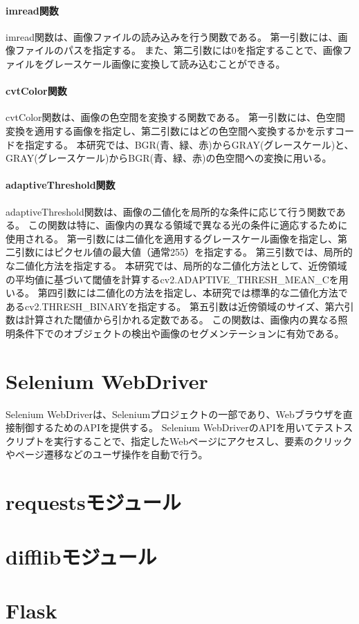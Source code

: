 \paragraph{imread関数}
imread関数は、画像ファイルの読み込みを行う関数である。
第一引数には、画像ファイルのパスを指定する。
また、第二引数には0を指定することで、画像ファイルをグレースケール画像に変換して読み込むことができる。
\paragraph{cvtColor関数}
cvtColor関数は、画像の色空間を変換する関数である。
第一引数には、色空間変換を適用する画像を指定し、第二引数にはどの色空間へ変換するかを示すコードを指定する。
本研究では、BGR(青、緑、赤)からGRAY(グレースケール)と、GRAY(グレースケール)からBGR(青、緑、赤)の色空間への変換に用いる。
\paragraph{adaptiveThreshold関数}
adaptiveThreshold関数は、画像の二値化を局所的な条件に応じて行う関数である。
この関数は特に、画像内の異なる領域で異なる光の条件に適応するために使用される。
第一引数には二値化を適用するグレースケール画像を指定し、第二引数にはピクセル値の最大値（通常255）を指定する。
第三引数では、局所的な二値化方法を指定する。
本研究では、局所的な二値化方法として、近傍領域の平均値に基づいて閾値を計算するcv2.ADAPTIVE\_THRESH\_MEAN\_Cを用いる。
第四引数には二値化の方法を指定し、本研究では標準的な二値化方法であるcv2.THRESH\_BINARYを指定する。
第五引数は近傍領域のサイズ、第六引数は計算された閾値から引かれる定数である。
この関数は、画像内の異なる照明条件下でのオブジェクトの検出や画像のセグメンテーションに有効である。

\section{Selenium WebDriver}\label{sec:Selenium_WebDriver}
Selenium WebDriver\cite{Selenium WebDriver}は、Seleniumプロジェクト\cite{Selenium}の一部であり、Webブラウザを直接制御するためのAPIを提供する。
Selenium WebDriverのAPIを用いてテストスクリプトを実行することで、指定したWebページにアクセスし、要素のクリックやページ遷移などのユーザ操作を自動で行う。
\section{requestsモジュール}\label{sec:requests}

\section{difflibモジュール}\label{sec:difflib}

\section{Flask}\label{sec:Flask}
